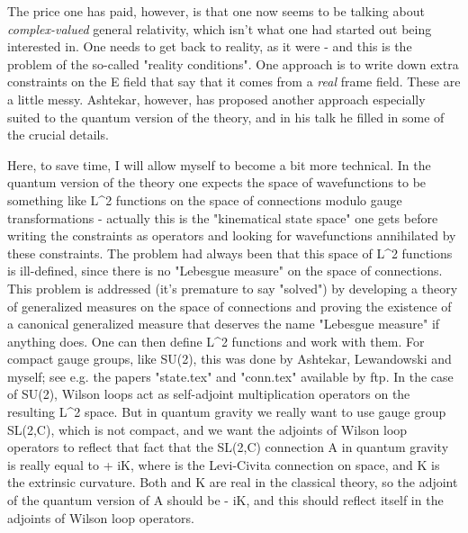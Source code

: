 The price one has paid, however, is that one now seems to be
talking about \emph{complex-valued} general relativity, which isn't
what one had started out being interested in.  One needs to get
back to reality, as it were - and this is the problem of the
so-called "reality conditions".  One approach is to write down extra
constraints on the E field that say that it comes from a \emph{real}
frame field.  These are a little messy.   Ashtekar,
however, has proposed another approach especially suited to
the quantum version of the theory, and in his talk he filled in
some of the crucial details.   

Here, to save time, I will allow myself to become a bit more
technical.  In the quantum version of the theory one expects the
space of wavefunctions to be something like L^2 functions on the
space of connections modulo gauge transformations - actually
this is the "kinematical state space" one gets before writing the
constraints as operators and looking for wavefunctions
annihilated by these constraints.  The problem had always been
that this space of L^2 functions is ill-defined, since there is no "Lebesgue
measure" on the space of connections.  This problem is addressed
(it's premature to say "solved") by developing a theory of
generalized measures on the space of connections and proving the
existence of a canonical generalized measure that deserves the
name "Lebesgue measure" if anything does.   One can then define
L^2 functions and work with them.   For compact gauge groups,
like SU(2), this was done by Ashtekar, Lewandowski and myself;
see e.g. the papers "state.tex" and "conn.tex" available by ftp.  
In the case of SU(2), Wilson loops act as self-adjoint
multiplication operators on the resulting L^2 space.   But in
quantum gravity we really want to use gauge group SL(2,C), which
is not compact, and we want the adjoints of Wilson loop operators
to reflect that fact that the SL(2,C) connection A in quantum
gravity is really equal to \Gamma  + iK, where \Gamma  is the
Levi-Civita connection on space, and K is the extrinsic
curvature.  Both \Gamma  and K are real in the classical theory, so 
the adjoint of the quantum version of A should be \Gamma  - iK, and
this should reflect itself in the adjoints of Wilson loop
operators.   


